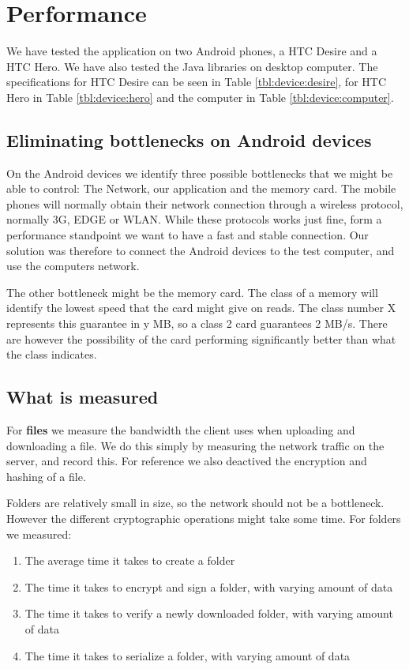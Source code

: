 \documentclass[pdftex,english,10pt,b5paper,twoside]{book}
\begin{document}
\section{Performance}
We have tested the application on two Android phones, a HTC Desire and a HTC
Hero. We have also tested the Java libraries on desktop computer. The
specifications for HTC Desire can be seen in Table \ref{tbl:device:desire},
for HTC Hero in Table \ref{tbl:device:hero} and the computer in Table
\ref{tbl:device:computer}.





\subsection{Eliminating bottlenecks on Android devices}
On the Android devices we identify three possible bottlenecks that we might be
able to control: The Network, our application and the memory card. The mobile
phones will normally obtain their network connection through a wireless
protocol, normally 3G, EDGE or WLAN. While these protocols works just fine,
form a performance standpoint we want to have a fast and stable connection. Our
solution was therefore to connect the Android devices to the test computer, and
use the computers network.

The other bottleneck might be the memory card. The class of a memory will
identify the lowest speed that the card might give on reads. The class number X
represents this guarantee in y MB, so a class 2 card guarantees 2 MB/s. There
are however the possibility of the card performing significantly better than
what the class indicates.

\subsection{What is measured}
For \textbf{files} we measure the bandwidth the client uses when uploading and
downloading a file. We do this simply by measuring the network traffic on the
server, and record this. For reference we also deactived the encryption and
hashing of a file. 

Folders are relatively small in size, so the network should not be a
bottleneck. However the different cryptographic operations might take some
time. For folders we measured:

\begin{enumerate}
    \item The average time it takes to create a folder
    \item The time it takes to encrypt and sign a folder, with varying amount
    of data
    \item The time it takes to verify a newly downloaded folder, with varying
    amount of data
    \item The time it takes to serialize a folder, with varying amount of data
\end{enumerate}
\end{document}
